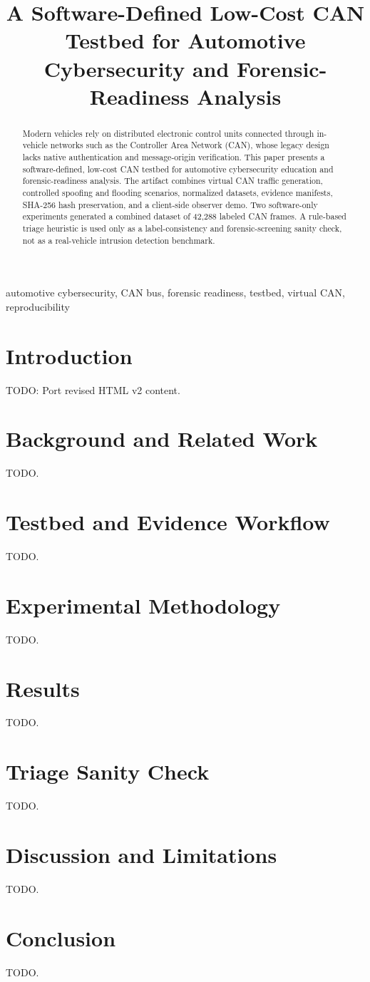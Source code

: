 \documentclass[conference]{IEEEtran}
\begin{document}
\title{A Software-Defined Low-Cost CAN Testbed for Automotive Cybersecurity and Forensic-Readiness Analysis}
\author{}
\maketitle
\begin{abstract}
Modern vehicles rely on distributed electronic control units connected through in-vehicle networks such as the Controller Area Network (CAN), whose legacy design lacks native authentication and message-origin verification. This paper presents a software-defined, low-cost CAN testbed for automotive cybersecurity education and forensic-readiness analysis. The artifact combines virtual CAN traffic generation, controlled spoofing and flooding scenarios, normalized datasets, evidence manifests, SHA-256 hash preservation, and a client-side observer demo. Two software-only experiments generated a combined dataset of 42,288 labeled CAN frames. A rule-based triage heuristic is used only as a label-consistency and forensic-screening sanity check, not as a real-vehicle intrusion detection benchmark.
\end{abstract}
\begin{IEEEkeywords}
automotive cybersecurity, CAN bus, forensic readiness, testbed, virtual CAN, reproducibility
\end{IEEEkeywords}
\section{Introduction}
TODO: Port revised HTML v2 content.
\section{Background and Related Work}
TODO.
\section{Testbed and Evidence Workflow}
TODO.
\section{Experimental Methodology}
TODO.
\section{Results}
TODO.
\section{Triage Sanity Check}
TODO.
\section{Discussion and Limitations}
TODO.
\section{Conclusion}
TODO.


\end{document}
